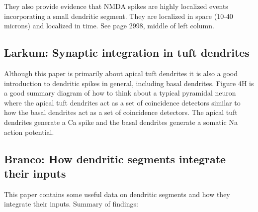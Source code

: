 \documentclass{article} %
\begin{document}
They also provide evidence that NMDA spikes are highly localized events
incorporating a small dendritic segment. They are localized in space (10-40
microns) and localized in time. See page 2998, middle of left column.

\subsection{Larkum: Synaptic integration in tuft dendrites}

Although this paper \cite{Larkum2009} is primarily about apical tuft dendrites
it is also a good introduction to dendritic spikes in general, including basal
dendrites.  Figure 4H is a good summary diagram of how to think about a typical
pyramidal neuron where the apical tuft dendrites act as a set of coincidence
detectors similar to how the basal dendrites act as a set of coincidence
detectors.  The apical tuft dendrites generate a Ca spike and the basal
dendrites generate a somatic Na action potential.

\subsection{Branco: How dendritic segments integrate their inputs}

This paper \cite{Branco2011} contains some useful data on dendritic segments
and how they integrate their inputs. Summary of findings:
\end{document}
